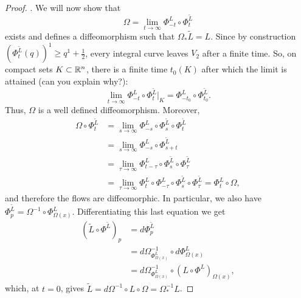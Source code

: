 \begin{proof}
  . We will now show that
  \begin{equation}
    \Omega = \lim_{t\to\infty} \Phi_{-t}^L \circ \Phi_t^{\widetilde{L}}
  \end{equation}
  exists and defines a diffeomorphism such that $\Omega_* \widetilde{L} = L$.
  Since by construction $(\Phi_t^{\widetilde{L}}(q))^1 \geq q^1 + \frac12$, every integral curve leaves $V_2$ after a finite time.
  So, on compact sets $K\subset\mathbb{R}^n$, there is a finite time $t_0(K)$ after which the limit is attained (can you explain why?):
  \begin{equation}
    \lim_{t\to\infty} \Phi_{-t}^L \circ \Phi_t^{\widetilde{L}}\Big|_K = \Phi_{-t_0}^L \circ \Phi_{t_0}^{\widetilde{L}}.
  \end{equation}
  Thus, $\Omega$ is a well defined diffeomorphism.
  Moreover,
  \begin{align}
    \Omega \circ \Phi^{\widetilde{L}}_t &= \lim_{s\to\infty} \Phi_{-s}^L \circ \Phi^{\widetilde{L}}_s \circ \Phi^{\widetilde{L}}_t \\
    &= \lim_{s\to\infty} \Phi_{-s}^L \circ \Phi^{\widetilde{L}}_{s+t} \\
    &= \lim_{\tau\to\infty} \Phi_{t-\tau}^L \circ \Phi^{\widetilde{L}}_s \circ \Phi^{\widetilde{L}}_\tau \\
    &= \lim_{\tau\to\infty} \Phi_{t}^L \circ \Phi_{-\tau}^L \circ \Phi^{\widetilde{L}}_s \circ \Phi^{\widetilde{L}}_\tau = \Phi_t^L \circ \Omega,
  \end{align}
  and therefore the flows are diffeomorphic.
  In particular, we also have $\Phi_p^{\widetilde{L}} = \Omega^{-1} \circ \Phi^L_{\Omega(x)}$.
  Differentiating this last equation we get
  \begin{align}
    (\widetilde{L} \circ \Phi^{\widetilde{L}})_p &= d\Phi^{\widetilde{L}}_p \\
    &= d\Omega^{-1}_{\Phi^L_{\Omega(x)}} \circ d\Phi^L_{\Omega(x)} \\
    &= d\Omega^{-1}_{\Phi^L_{\Omega(x)}} \circ (L \circ \Phi^L)_{\Omega(x)},
  \end{align}
    which, at $t=0$, gives $\widetilde{L} = d\Omega^{-1} \circ L \circ \Omega = \Omega^{-1}_* L$.
\end{proof}

